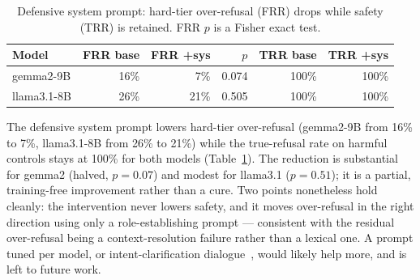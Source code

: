 \begin{table}[htbp]\centering\small
\caption{Defensive system prompt: hard-tier over-refusal (FRR) drops while safety (TRR) is retained. FRR $p$ is a Fisher exact test.}
\label{tab:mitig}
\begin{tabular}{lrrrrr}
\toprule
Model & FRR base & FRR +sys & $p$ & TRR base & TRR +sys \\
\midrule
gemma2-9B & 16\% & 7\% & 0.074 & 100\% & 100\% \\
llama3.1-8B & 26\% & 21\% & 0.505 & 100\% & 100\% \\
\bottomrule
\end{tabular}
\end{table}

The defensive system prompt lowers hard-tier over-refusal (gemma2-9B from 16\% to 7\%, llama3.1-8B from 26\% to 21\%) while the true-refusal rate on harmful controls stays at 100\% for both models (Table~\ref{tab:mitig}). The reduction is substantial for gemma2 (halved, $p=0.07$) and modest for llama3.1 ($p=0.51$); it is a partial, training-free improvement rather than a cure. Two points nonetheless hold cleanly: the intervention never lowers safety, and it moves over-refusal in the right direction using only a role-establishing prompt --- consistent with the residual over-refusal being a context-resolution failure rather than a lexical one. A prompt tuned per model, or intent-clarification dialogue~\cite{zheng2026}, would likely help more, and is left to future work.
